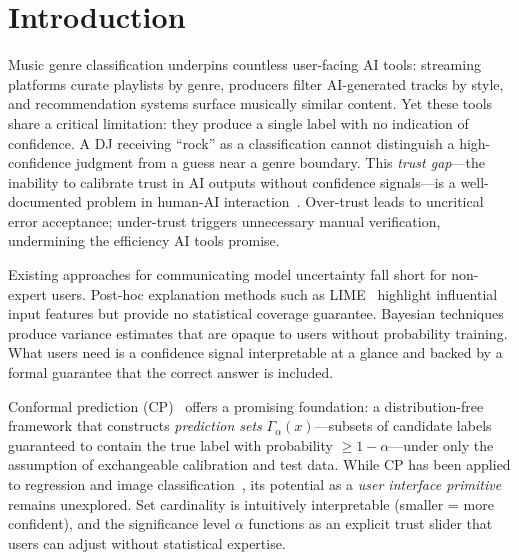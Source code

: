 
\section{Introduction}

Music genre classification underpins countless user-facing AI tools: streaming
platforms curate playlists by genre, producers filter AI-generated tracks by
style, and recommendation systems surface musically similar content. Yet these
tools share a critical limitation: they produce a single label with no
indication of confidence. A DJ receiving ``rock'' as a classification cannot
distinguish a high-confidence judgment from a guess near a genre boundary. This
\emph{trust gap}---the inability to calibrate trust in AI outputs without
confidence signals---is a well-documented problem in human-AI
interaction~\cite{amershi2019guidelines,miller2019explanation}. Over-trust leads
to uncritical error acceptance; under-trust triggers unnecessary manual
verification, undermining the efficiency AI tools promise.

Existing approaches for communicating model uncertainty fall short for
non-expert users. Post-hoc explanation methods such as
LIME~\cite{ribeiro2016lime} highlight influential input features but provide no
statistical coverage guarantee. Bayesian techniques produce variance estimates
that are opaque to users without probability training. What users need is a
confidence signal interpretable at a glance and backed by a formal guarantee
that the correct answer is included.

Conformal prediction (CP)~\cite{vovk2005algorithmic,angelopoulos2023gentle}
offers a promising foundation: a distribution-free framework that constructs
\emph{prediction sets} $\Gamma_\alpha(x)$---subsets of candidate labels
guaranteed to contain the true label with probability $\geq 1-\alpha$---under
only the assumption of exchangeable calibration and test data. While CP has been
applied to regression and image classification~\cite{romano2019conformalized,angelopoulos2021uncertainty},
its potential as a \emph{user interface primitive} remains unexplored. Set
cardinality is intuitively interpretable (smaller = more confident), and the
significance level $\alpha$ functions as an explicit trust slider that users can
adjust without statistical expertise.

